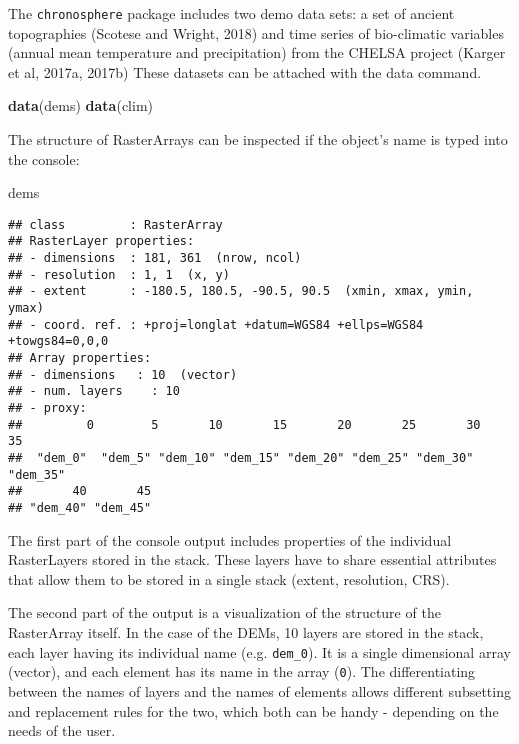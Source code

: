 \documentclass[]{article}
\newenvironment{Shaded}{\begin{snugshade}}{\end{snugshade}}
\newcommand{\KeywordTok}[1]{\textcolor[rgb]{0.13,0.29,0.53}{\textbf{#1}}}
\newcommand{\NormalTok}[1]{#1}
\begin{document}
The \texttt{chronosphere} package includes two demo data sets: a set of
ancient topographies (Scotese and Wright, 2018) and time series of
bio-climatic variables (annual mean temperature and precipitation) from
the CHELSA project (Karger et al, 2017a, 2017b) These datasets can be
attached with the data command.

\begin{Shaded}
\begin{Highlighting}[]
\KeywordTok{data}\NormalTok{(dems)}
\KeywordTok{data}\NormalTok{(clim)}
\end{Highlighting}
\end{Shaded}

The structure of RasterArrays can be inspected if the object's name is
typed into the console:

\begin{Shaded}
\begin{Highlighting}[]
\NormalTok{dems}
\end{Highlighting}
\end{Shaded}

\begin{verbatim}
## class         : RasterArray 
## RasterLayer properties: 
## - dimensions  : 181, 361  (nrow, ncol)
## - resolution  : 1, 1  (x, y)
## - extent      : -180.5, 180.5, -90.5, 90.5  (xmin, xmax, ymin, ymax)
## - coord. ref. : +proj=longlat +datum=WGS84 +ellps=WGS84 +towgs84=0,0,0 
## Array properties: 
## - dimensions   : 10  (vector)
## - num. layers    : 10
## - proxy:
##         0        5       10       15       20       25       30       35 
##  "dem_0"  "dem_5" "dem_10" "dem_15" "dem_20" "dem_25" "dem_30" "dem_35" 
##       40       45 
## "dem_40" "dem_45"
\end{verbatim}

The first part of the console output includes properties of the
individual RasterLayers stored in the stack. These layers have to share
essential attributes that allow them to be stored in a single stack
(extent, resolution, CRS).

The second part of the output is a visualization of the structure of the
RasterArray itself. In the case of the DEMs, 10 layers are stored in the
stack, each layer having its individual name (e.g. \texttt{dem\_0}). It
is a single dimensional array (vector), and each element has its name in
the array (\texttt{0}). The differentiating between the names of layers
and the names of elements allows different subsetting and replacement
rules for the two, which both can be handy - depending on the needs of
the user.
\end{document}
